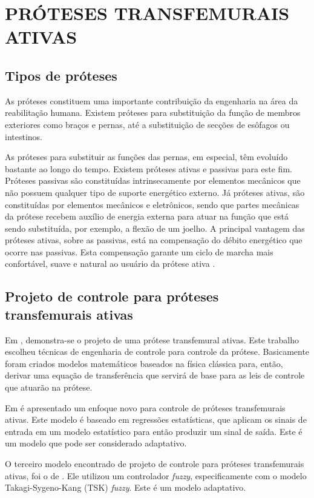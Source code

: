 \section[PRÓTESES TRANSFEMURAIS ATIVAS]{PRÓTESES TRANSFEMURAIS ATIVAS}

\subsection[Tipos de próteses]{\textbf{Tipos de próteses}}

As próteses constituem uma importante contribuição da engenharia na área da reabilitação humana. Existem próteses para substituição da função de membros exteriores como braços e pernas, até a substituição de secções de esôfagos ou intestinos.

As próteses para substituir as funções das pernas, em especial, têm evoluído bastante ao longo do tempo.
Existem próteses ativas e passivas para este fim. Próteses passivas são constituídas intrinsecamente por elementos mecânicos que não possuem qualquer tipo de suporte energético externo.
Já próteses ativas, são constituídas por elementos mecânicos e eletrônicos, sendo que partes mecânicas da prótese recebem auxílio de energia externa para atuar na função que está sendo substituída, por exemplo, a flexão de um joelho.
A principal vantagem das próteses ativas, sobre as passivas, está na compensação do débito energético que ocorre nas passivas. Esta compensação garante um ciclo de marcha mais confortável, suave e natural ao usuário da prótese ativa \cite{Borjian2008}.

\subsection[Projeto de controle para próteses transfemurais ativas]{\textbf{Projeto de controle para próteses transfemurais ativas}}

Em , demonstra-se o projeto de uma prótese transfemural ativas.
Este trabalho escolheu técnicas de engenharia de controle para controle da prótese.
Basicamente foram criados modelos matemáticos baseados na física clássica para, então, derivar uma equação de transferência que servirá de base para as leis de controle que atuarão na prótese. 

Em  é apresentado um enfoque novo para controle de próteses transfemurais ativas.
Este modelo é baseado em regressões estatísticas, que aplicam os sinais de entrada em um modelo estatístico para então produzir um sinal de saída.
Este é um modelo que pode ser considerado adaptativo.

O terceiro modelo encontrado de projeto de controle para próteses transfemurais ativas, foi o de . Ele utilizou um controlador \emph{fuzzy}, especificamente com o modelo Takagi-Sygeno-Kang (TSK) \emph{fuzzy}. Este é um modelo adaptativo.



